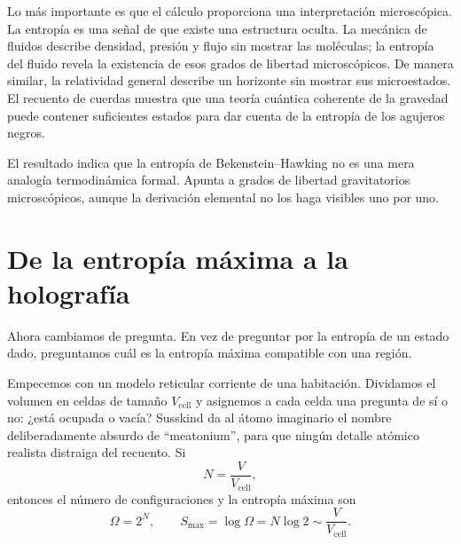 Lo más importante es que el cálculo proporciona una interpretación microscópica. La entropía es una señal de que existe una estructura oculta. La mecánica de fluidos describe densidad, presión y flujo sin mostrar las moléculas; la entropía del fluido revela la existencia de esos grados de libertad microscópicos. De manera similar, la relatividad general describe un horizonte sin mostrar sus microestados. El recuento de cuerdas muestra que una teoría cuántica coherente de la gravedad puede contener suficientes estados para dar cuenta de la entropía de los agujeros negros.

\begin{classroomqa}
\end{classroomqa}

El resultado indica que la entropía de Bekenstein--Hawking no es una mera analogía termodinámica formal. Apunta a grados de libertad gravitatorios microscópicos, aunque la derivación elemental no los haga visibles uno por uno.

\section{De la entropía máxima a la holografía}

Ahora cambiamos de pregunta. En vez de preguntar por la entropía de un estado dado, preguntamos cuál es la entropía máxima compatible con una región.

Empecemos con un modelo reticular corriente de una habitación. Dividamos el volumen en celdas de tamaño \(V_{\mathrm{cell}}\) y asignemos a cada celda una pregunta de sí o no: ¿está ocupada o vacía? Susskind da al átomo imaginario el nombre deliberadamente absurdo de ``meatonium'', para que ningún detalle atómico realista distraiga del recuento. Si
\begin{equation}
N=\frac{V}{V_{\mathrm{cell}}},
\end{equation}
entonces el número de configuraciones y la entropía máxima son
\begin{equation}
\Omega=2^N,
\qquad
S_{\max}=\log\Omega=N\log2
\sim\frac{V}{V_{\mathrm{cell}}}.
\label{eq:l07-volume-count}
\end{equation}

